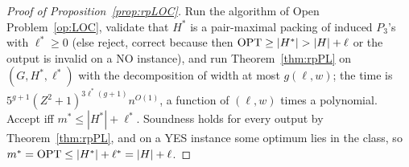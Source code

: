 \begin{proof}[Proof of Proposition~\ref{prop:rpLOC}]
Run the algorithm of Open Problem~\ref{op:LOC}, validate that $H^*$ is a pair-maximal packing of induced $P_3$'s with $\ell^*\ge0$ (else reject, correct because then $\OPT\ge|H^*|>|H|+\ell$ or the output is invalid on a NO instance), and run Theorem~\ref{thm:rpPL} on $(G,H^*,\ell^*)$ with the decomposition of width at most $g(\ell,w)$; the time is $5^{g+1}(Z^2+1)^{3\ell^*(g+1)}n^{O(1)}$, a function of $(\ell,w)$ times a polynomial. Accept iff $m^*\le|H^*|+\ell^*$. Soundness holds for every output by Theorem~\ref{thm:rpPL}, and on a YES instance some optimum lies in the class, so $m^*=\mathrm{OPT}\le|H^*|+\ell^*=|H|+\ell$.
\end{proof}
